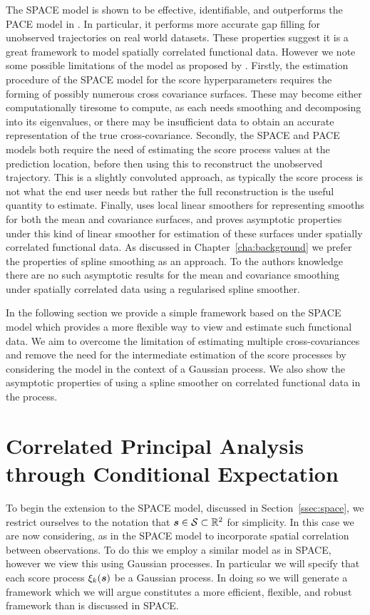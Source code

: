 The SPACE model is shown to be effective, identifiable, and outperforms the PACE model in \citep{liu_functional_2017}.
In particular, it performs more accurate gap filling for unobserved trajectories on real world datasets.
These properties suggest it is a great framework to model spatially correlated functional data.
However we note some possible limitations of the model as proposed by \citep{liu_functional_2017}.
Firstly, the estimation procedure of the SPACE model for the score hyperparameters requires the forming of possibly numerous cross covariance surfaces.
These may become either computationally tiresome to compute, as each needs smoothing and decomposing into its eigenvalues, or there may be insufficient data to obtain an accurate representation of the true cross-covariance. 
Secondly, the SPACE and PACE models both require the need of estimating the score process values at the prediction location, before then using this to reconstruct the unobserved trajectory.
This is a slightly convoluted approach, as typically the score process is not what the end user needs but rather the full reconstruction is the useful quantity to estimate. 
Finally, \citep{liu_functional_2017} uses local linear smoothers for representing smooths for both the mean and covariance surfaces, and proves asymptotic properties under this kind of linear smoother for estimation of these surfaces under spatially correlated functional data.
As discussed in Chapter~\ref{cha:background} we prefer the properties of spline smoothing as an approach.
To the authors knowledge there are no such asymptotic results for the mean and covariance smoothing under spatially correlated data using a regularised spline smoother. 

In the following section we provide a simple framework based on the SPACE model which provides a more flexible way to view and estimate such functional data.
We aim to overcome the limitation of estimating multiple cross-covariances and remove the need for the intermediate estimation of the score processes by considering the model in the context of a Gaussian process. 
We also show the asymptotic properties of using a spline smoother on correlated functional data in the process.

\section{Correlated Principal Analysis through Conditional Expectation} 
To begin the extension to the SPACE model, discussed in Section~\ref{ssec:space}, we restrict ourselves to the notation that $\bm{{s}} \in \mathcal{S} \subset \mathbb{R}^2$ for simplicity.
In this case we are now considering, as in the SPACE model to incorporate spatial correlation between observations. 
To do this we employ a similar model as in SPACE, however we view this using Gaussian processes.
In particular we will specify that each score process $\xi_k(\bm{{s}})$ be a Gaussian process.
In doing so we will generate a framework which we will argue constitutes a more efficient, flexible, and robust framework than is discussed in SPACE. 

